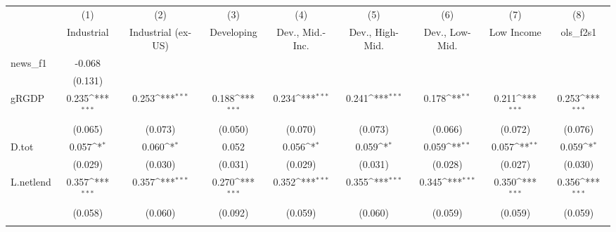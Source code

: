 {
\def\sym#1{\ifmmode^{#1}\else\(^{#1}\)\fi}
\begin{tabular}{l*{8}{c}}
\toprule
            &\multicolumn{1}{c}{(1)}&\multicolumn{1}{c}{(2)}&\multicolumn{1}{c}{(3)}&\multicolumn{1}{c}{(4)}&\multicolumn{1}{c}{(5)}&\multicolumn{1}{c}{(6)}&\multicolumn{1}{c}{(7)}&\multicolumn{1}{c}{(8)}\\
            &\multicolumn{1}{c}{Industrial}&\multicolumn{1}{c}{Industrial (ex-US)}&\multicolumn{1}{c}{Developing}&\multicolumn{1}{c}{Dev., Mid.-Inc.}&\multicolumn{1}{c}{Dev., High-Mid.}&\multicolumn{1}{c}{Dev., Low-Mid.}&\multicolumn{1}{c}{Low Income}&\multicolumn{1}{c}{ols\_f2s1}\\
\midrule
news\_f1     &      -0.068         &                     &                     &                     &                     &                     &                     &                     \\
            &     (0.131)         &                     &                     &                     &                     &                     &                     &                     \\
\addlinespace
gRGDP       &       0.235\sym{***}&       0.253\sym{***}&       0.188\sym{***}&       0.234\sym{***}&       0.241\sym{***}&       0.178\sym{**} &       0.211\sym{***}&       0.253\sym{***}\\
            &     (0.065)         &     (0.073)         &     (0.050)         &     (0.070)         &     (0.073)         &     (0.066)         &     (0.072)         &     (0.076)         \\
\addlinespace
D.tot       &       0.057\sym{*}  &       0.060\sym{*}  &       0.052         &       0.056\sym{*}  &       0.059\sym{*}  &       0.059\sym{**} &       0.057\sym{**} &       0.059\sym{*}  \\
            &     (0.029)         &     (0.030)         &     (0.031)         &     (0.029)         &     (0.031)         &     (0.028)         &     (0.027)         &     (0.030)         \\
\addlinespace
L.netlend   &       0.357\sym{***}&       0.357\sym{***}&       0.270\sym{***}&       0.352\sym{***}&       0.355\sym{***}&       0.345\sym{***}&       0.350\sym{***}&       0.356\sym{***}\\
            &     (0.058)         &     (0.060)         &     (0.092)         &     (0.059)         &     (0.060)         &     (0.059)         &     (0.059)         &     (0.059)         \\
\addlinespace

\end{tabular}}
